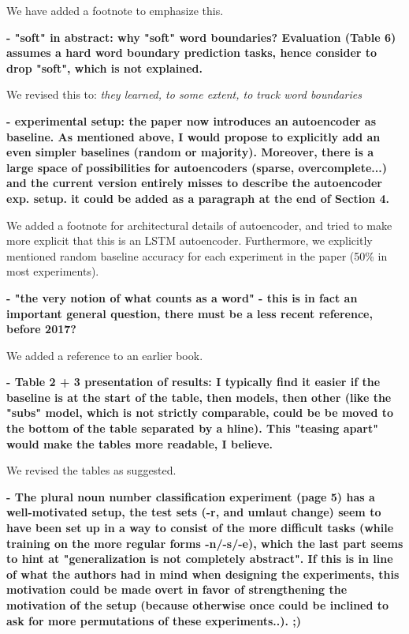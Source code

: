 \documentclass{article}[11pt,a4paper,oneside]
\begin{document}
We have added a footnote to emphasize this.\newline

\textbf{- "soft" in abstract: why "soft" word boundaries? Evaluation (Table 6)
assumes a hard word boundary prediction tasks, hence consider to drop
"soft", which is not explained.}

We revised this to: \textit{they learned, to some extent, to track word boundaries}\newline

\textbf{- experimental setup: the paper now introduces an autoencoder as baseline.
As mentioned above, I would propose to explicitly add an even simpler
baselines (random or majority). Moreover, there is a large space of
possibilities for autoencoders (sparse, overcomplete...) and the current
version entirely misses to describe the autoencoder exp. setup. it could be
added as a paragraph at the end of Section 4.}

We added a footnote for architectural details of autoencoder, and tried to make more explicit that this is an LSTM autoencoder. Furthermore, we explicitly mentioned random baseline accuracy for each experiment in the paper (50\% in most experiments).\newline

\textbf{- "the very notion of what counts as a word" - this is in fact an important
general question, there must be a less recent reference, before 2017?}

We added a reference to an earlier book.\newline

\textbf{- Table 2 + 3 presentation of results: I typically find it easier if the
baseline is at the start of the table, then models, then other (like the
"subs" model, which is not strictly comparable, could be be moved to the
bottom of the table separated by a hline). This "teasing apart" would make
the tables more readable, I believe.}

We revised the tables as suggested.\newline

\textbf{- The plural noun number classification experiment (page 5) has a
well-motivated setup, the test sets (-r, and umlaut change) seem to have
been set up in a way to consist of the more difficult tasks (while training
on the more regular forms -n/-s/-e), which the last part seems to hint at
"generalization is not completely abstract". If this is in line of what the
authors had in mind when designing the experiments, this motivation could be
made overt in favor of strengthening the motivation of the setup (because
otherwise once could be inclined to ask for more permutations of these
experiments..). ;)}
\end{document}

